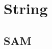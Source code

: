 \documentclass[a4paper,10pt,twocolumn,oneside]{article}
\begin{document}
\pagestyle{fancy}
\fancyfoot{}
\fancyhead[R]{\thepage}
\renewcommand{\headrulewidth}{0.4pt}
\renewcommand{\contentsname}{Contents} 

\scriptsize
\tableofcontents

\newpage

\section{String}

\subsection{SAM}

\end{document}
